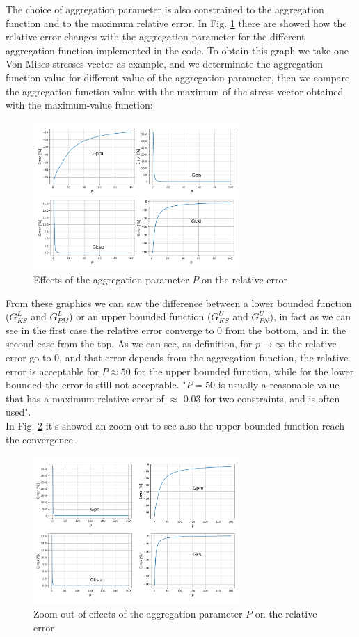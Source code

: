 The choice of aggregation parameter is also constrained to the aggregation function and to the maximum relative error. In Fig. \ref{fig:3_4} there are showed how the relative error changes with the aggregation parameter for the different aggregation function implemented in the code. To obtain this graph we take one Von Mises stresses vector as example, and we determinate the aggregation function value for different value of the aggregation parameter, then we compare the aggregation function value with the maximum of the stress vector obtained with the maximum-value function:
\begin{figure}[H]
	\centering
	\includegraphics[width = 0.7\textwidth]{./Immagini/3_4.png}
	\caption{Effects of the aggregation parameter $P$ on the relative error}
	\label{fig:3_4}
\end{figure}
From these graphics we can saw the difference between a lower bounded function ($G_{KS}^L$ and $G_{PM}^L$) or an upper bounded function ($G_{KS}^U$ and $G_{PN}^U$), in fact as we can see in the first case the relative error converge to 0 from the bottom, and in the second case from the top. As we can see, as definition, for $p\to\infty$ the relative error go to 0, and that error depends from the aggregation function, the relative error is acceptable for $P\approx 50$ for the upper bounded function, while for the lower bounded the error is still not acceptable. "$P = 50$ is usually a reasonable value that has a maximum relative error of $\approx$ 0.03 for two constraints, and is often used"\cite{stu}.\\
In Fig. \ref{fig:3_5} it's showed an zoom-out to see also the upper-bounded function reach the convergence.
\begin{figure}[H]
	\centering
	\includegraphics[width = 0.7\textwidth]{./Immagini/3_5.png}
	\caption{Zoom-out of effects of the aggregation parameter $P$ on the relative error}
	\label{fig:3_5}
\end{figure}
